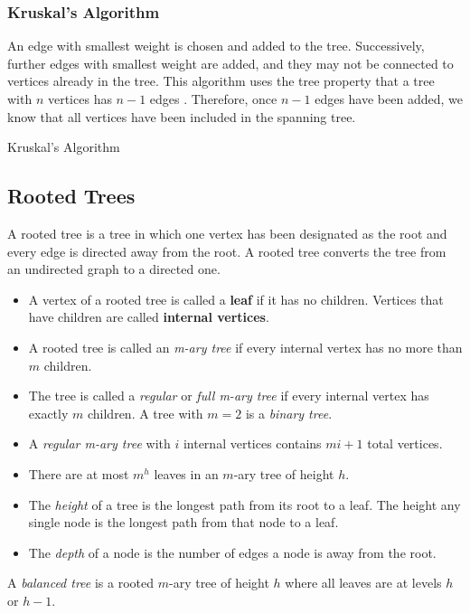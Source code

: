 \subsubsection{Kruskal's Algorithm}
An edge with smallest weight is chosen and added to the tree. Successively, further edges with smallest weight are added, and they may not be connected to vertices already in the tree. This algorithm uses the tree property that a tree with \( n \) vertices has \( n-1 \) edges . Therefore, once \( n-1 \) edges have been added, we know that all vertices have been included in the spanning tree. 

\begin{algorithm}[H]
	\caption{Kruskal's Algorithm}\label{alg:kruskal}
	\begin{algorithmic}
		\EndFor{}
		\EndFunction{}
	\end{algorithmic}
\end{algorithm}

\subsection{Rooted Trees}
A rooted tree is a tree in which one vertex has been designated as the root and every edge is directed away from the root. A rooted tree converts the tree from an undirected graph to a directed one.

\begin{itemize}
	\item A vertex of a rooted tree is called a \textbf{leaf} if it has no children. Vertices that have children are called \textbf{internal vertices}.
	\item A rooted tree is called an \emph{m-ary tree} if every internal vertex has no more than \( m \) children.
	\item The tree is called a \emph{regular} or \emph{full m-ary tree} if every internal vertex has exactly \( m \) children. A tree with \( m = 2 \) is a \emph{binary tree}.
	\item A \emph{regular m-ary tree} with \( i \) internal vertices contains \( mi+1 \) total vertices.
	\item There are at most \( m^h \) leaves in an \( m \)-ary tree of height \( h \). 
	\item The \emph{height} of a tree is the longest path from its root to a leaf. The height any single node is the longest path from that node to a leaf.
	\item The \emph{depth} of a node is the number of edges a node is away from the root.
\end{itemize}
A \emph{balanced tree} is a rooted \( m \)-ary tree of height \( h \) where all leaves are at levels \( h \) or \( h-1 \).




